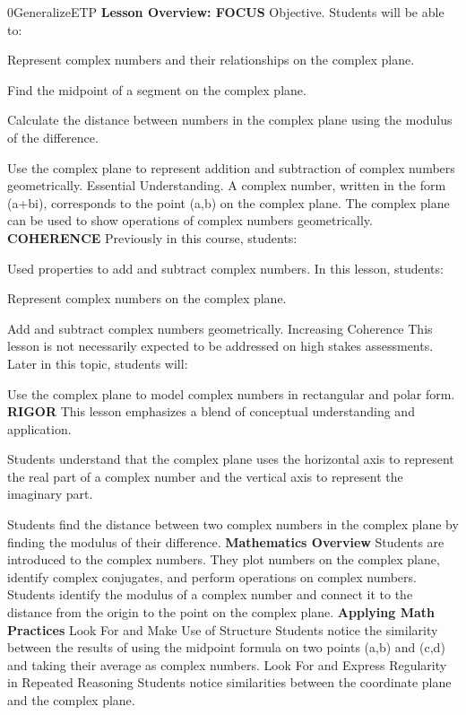 \documentclass{article}
\newenvironment{te-addendum}[2]{}{}     %
\newcommand{\te}[1]{}                   %
\begin{document}
\begin{te-addendum}{0}{GeneralizeETP}
\textbf{Lesson Overview: FOCUS}
Objective. Students will be able to:
\item Represent complex numbers and their relationships on the complex plane.
\item Find the midpoint of a segment on the complex plane.
\item Calculate the distance between numbers in the complex plane using the modulus of the difference.
\item Use the complex plane to represent addition and subtraction of complex numbers geometrically.
Essential Understanding. A complex number, written in the form (a+bi), corresponds to the point (a,b) on the complex plane. The complex plane can be used to show operations of complex numbers geometrically.
\textbf{COHERENCE}
Previously in this course, students:
\item Used properties to add and subtract complex numbers.
In this lesson, students:
\item Represent complex numbers on the complex plane.
\item Add and subtract complex numbers geometrically.
Increasing Coherence This lesson is not necessarily expected to be addressed on high stakes assessments.
Later in this topic, students will:
\item Use the complex plane to model complex numbers in rectangular and polar form.
\textbf{RIGOR}
This lesson emphasizes a blend of conceptual understanding and application.
\item Students understand that the complex plane uses the horizontal axis to represent the real part of a complex number and the vertical axis to represent the imaginary part.
\item Students find the distance between two complex numbers in the complex plane by finding the modulus of their difference.
\textbf{Mathematics Overview}
Students are introduced to the complex numbers. They plot numbers on the complex plane, identify complex conjugates, and perform operations on complex numbers. Students identify the modulus of a complex number and connect it to the distance from the origin to the point on the complex plane.
\textbf{Applying Math Practices}
Look For and Make Use of Structure
Students notice the similarity between the results of using the midpoint formula on two points (a,b) and (c,d) and taking their average as complex numbers.
Look For and Express Regularity in Repeated Reasoning
Students notice similarities between the coordinate plane and the complex plane.
\te{Program Resources. SavvasRealize.com.}
\end{te-addendum}
\end{document}
